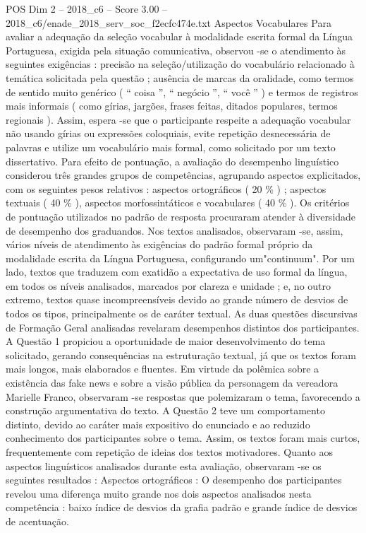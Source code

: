 \begin{textsample}{POS Dim 2 – 2018\_c6 – Score 3.00 – 2018\_c6/enade\_2018\_serv\_soc\_f2ecfc474e.txt}
Aspectos Vocabulares Para avaliar a adequação da seleção vocabular à modalidade escrita formal da Língua Portuguesa, exigida pela situação comunicativa, observou -se o atendimento às seguintes exigências : precisão na seleção/utilização do vocabulário relacionado à temática solicitada pela questão ; ausência de marcas da oralidade, como termos de sentido muito genérico ( “ coisa ”, “ negócio ”, “ você ” ) e termos de registros mais informais ( como gírias, jargões, frases feitas, ditados populares, termos regionais ).
Assim, espera -se que o participante respeite a adequação vocabular não usando gírias ou expressões coloquiais, evite repetição desnecessária de palavras e utilize um vocabulário mais formal, como solicitado por um texto dissertativo.
Para efeito de pontuação, a avaliação do desempenho linguístico considerou três grandes grupos de competências, agrupando aspectos explicitados, com os seguintes pesos relativos : aspectos ortográficos ( 20 \% ) ; aspectos textuais ( 40 \% ), aspectos morfossintáticos e vocabulares ( 40 \% ).
Os critérios de pontuação utilizados no padrão de resposta procuraram atender à diversidade de desempenho dos graduandos.
Nos textos analisados, observaram -se, assim, vários níveis de atendimento às exigências do padrão formal próprio da modalidade escrita da Língua Portuguesa, configurando um"continuum".
Por um lado, textos que traduzem com exatidão a expectativa de uso formal da língua, em todos os níveis analisados, marcados por clareza e unidade ; e, no outro extremo, textos quase incompreensíveis devido ao grande número de desvios de todos os tipos, principalmente os de caráter textual.
As duas questões discursivas de Formação Geral analisadas revelaram desempenhos distintos dos participantes.
A Questão 1 propiciou a oportunidade de maior desenvolvimento do tema solicitado, gerando consequências na estruturação textual, já que os textos foram mais longos, mais elaborados e fluentes.
Em virtude da polêmica sobre a existência das fake news e sobre a visão pública da personagem da vereadora Marielle Franco, observaram -se respostas que polemizaram o tema, favorecendo a construção argumentativa do texto.
A Questão 2 teve um comportamento distinto, devido ao caráter mais expositivo do enunciado e ao reduzido conhecimento dos participantes sobre o tema.
Assim, os textos foram mais curtos, frequentemente com repetição de ideias dos textos motivadores.
Quanto aos aspectos linguísticos analisados durante esta avaliação, observaram -se os seguintes resultados : Aspectos ortográficos : O desempenho dos participantes revelou uma diferença muito grande nos dois aspectos analisados nesta competência : baixo índice de desvios da grafia padrão e grande índice de desvios de acentuação.

\end{textsample}

